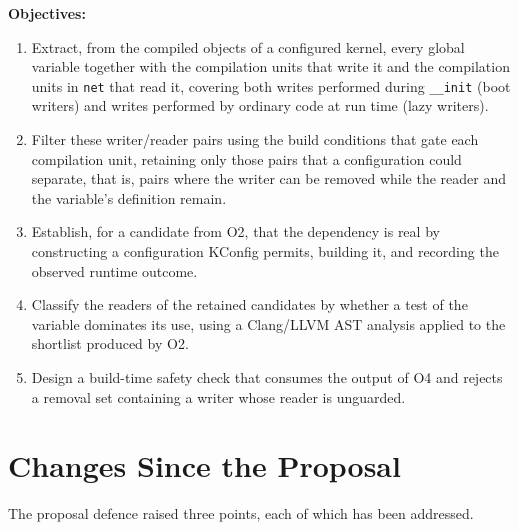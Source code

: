 \documentclass[12pt, a4paper, oneside]{book}
\begin{document}
\noindent\textbf{Objectives:}

\begin{enumerate}[leftmargin=*, label=\textbf{O\arabic*.}]

  \item Extract, from the compiled objects of a configured kernel, every global
        variable together with the compilation units that write it and the
        compilation units in \texttt{net} that read it, covering both writes
        performed during \texttt{\_\_init} (boot writers) and writes performed
        by ordinary code at run time (lazy writers).

  \item Filter these writer/reader pairs using the build conditions that gate
        each compilation unit, retaining only those pairs that a configuration
        could separate, that is, pairs where the writer can be removed while the
        reader and the variable's definition remain.

  \item Establish, for a candidate from O2, that the dependency is
        real by constructing a configuration KConfig permits, building it, and
        recording the observed runtime outcome.

  \item Classify the readers of the retained candidates by whether a test of the
        variable dominates its use, using a Clang/LLVM AST analysis applied to
        the shortlist produced by O2.

  \item Design a build-time safety check that consumes the output of O4 and
        rejects a removal set containing a writer whose reader is unguarded.
\end{enumerate}

\section{Changes Since the Proposal}

The proposal defence raised three points, each of which has been addressed.
\end{document}
